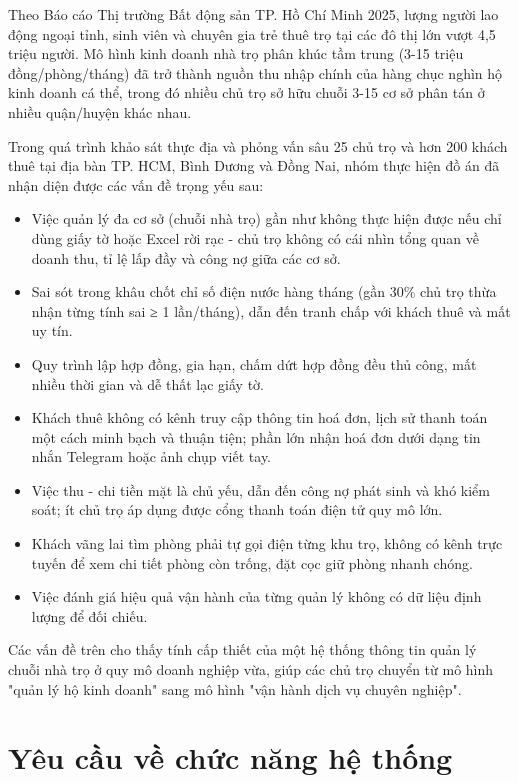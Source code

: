 \documentclass[a4paper,oneside]{report}
\begin{document}
Theo Báo cáo Thị trường Bất động sản TP. Hồ Chí Minh 2025, lượng người
lao động ngoại tỉnh, sinh viên và chuyên gia trẻ thuê trọ tại các đô thị
lớn vượt 4,5 triệu người. Mô hình kinh doanh nhà trọ phân khúc tầm trung
(3-15 triệu đồng/phòng/tháng) đã trở thành nguồn thu nhập chính của hàng
chục nghìn hộ kinh doanh cá thể, trong đó nhiều chủ trọ sở hữu chuỗi
3-15 cơ sở phân tán ở nhiều quận/huyện khác nhau.

Trong quá trình khảo sát thực địa và phỏng vấn sâu 25 chủ trọ và hơn 200
khách thuê tại địa bàn TP. HCM, Bình Dương và Đồng Nai, nhóm thực hiện
đồ án đã nhận diện được các vấn đề trọng yếu sau:

\begin{itemize}
\item
  Việc quản lý đa cơ sở (chuỗi nhà trọ) gần như không thực hiện được nếu
  chỉ dùng giấy tờ hoặc Excel rời rạc - chủ trọ không có cái nhìn tổng
  quan về doanh thu, tỉ lệ lấp đầy và công nợ giữa các cơ sở.
\item
  Sai sót trong khâu chốt chỉ số điện nước hàng tháng (gần 30\% chủ trọ
  thừa nhận từng tính sai ≥ 1 lần/tháng), dẫn đến tranh chấp với khách
  thuê và mất uy tín.
\item
  Quy trình lập hợp đồng, gia hạn, chấm dứt hợp đồng đều thủ công, mất
  nhiều thời gian và dễ thất lạc giấy tờ.
\item
  Khách thuê không có kênh truy cập thông tin hoá đơn, lịch sử thanh
  toán một cách minh bạch và thuận tiện; phần lớn nhận hoá đơn dưới dạng
  tin nhắn Telegram hoặc ảnh chụp viết tay.
\item
  Việc thu - chi tiền mặt là chủ yếu, dẫn đến công nợ phát sinh và khó
  kiểm soát; ít chủ trọ áp dụng được cổng thanh toán điện tử quy mô lớn.
\item
  Khách vãng lai tìm phòng phải tự gọi điện từng khu trọ, không có kênh
  trực tuyến để xem chi tiết phòng còn trống, đặt cọc giữ phòng nhanh
  chóng.
\item
  Việc đánh giá hiệu quả vận hành của từng quản lý không có dữ liệu định
  lượng để đối chiếu.
\end{itemize}

Các vấn đề trên cho thấy tính cấp thiết của một hệ thống thông tin quản
lý chuỗi nhà trọ ở quy mô doanh nghiệp vừa, giúp các chủ trọ chuyển từ
mô hình "quản lý hộ kinh doanh" sang mô hình "vận hành dịch vụ chuyên
nghiệp".

\section{Yêu cầu về chức năng hệ thống}
\end{document}

